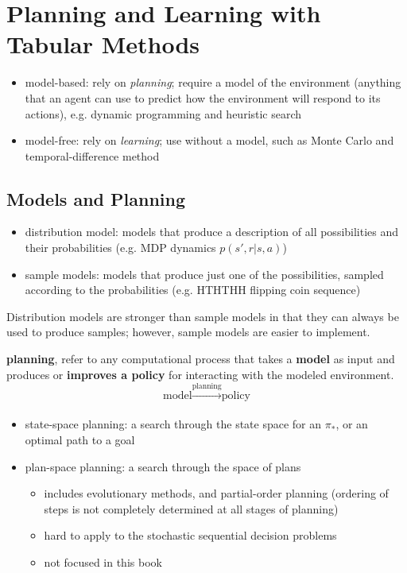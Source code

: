 \documentclass[sutton_barto_notes.tex]{subfiles}
\begin{document}
\newpage
\section{Planning and Learning with Tabular Methods}

\begin{itemize}
\item model-based: rely on \textit{planning}; require a model of the environment (anything that an agent can use to predict how the environment will respond to its actions), e.g. dynamic programming and heuristic search
\item model-free: rely on \textit{learning}; use without a model, such as Monte Carlo and temporal-difference method
\end{itemize}


\subsection{Models and Planning}

\begin{itemize}
\item distribution model: models that produce a description of all possibilities and their probabilities (e.g. MDP dynamics $p(s',r|s,a)$)
\item sample models: models that produce just one of the possibilities, sampled according to the probabilities (e.g. HTHTHH flipping coin sequence)
\end{itemize}

Distribution models are stronger than sample models in that they can always be used to produce samples; however, sample models are easier to implement.

\begin{definition}
\textbf{planning}, refer to any computational process that takes a \textbf{model} as input and produces or \textbf{improves a policy} for interacting with the modeled environment.
$$\text{model} \xrightarrow[]{\text{planning}} \text{policy} $$
\end{definition}

\begin{itemize}
\item state-space planning: a search through the state space for an $\pi_*$, or an optimal path to a goal
\item plan-space planning: a search through the space of plans
\begin{itemize}
	\item includes evolutionary methods, and partial-order planning (ordering of steps is not completely determined at all stages of planning)
	\item hard to apply to the stochastic sequential decision problems
	\item not focused in this book
\end{itemize}
\end{itemize}
\end{document}
